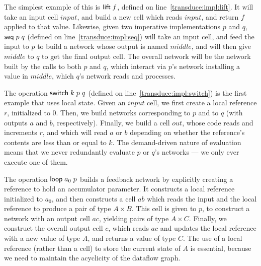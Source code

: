 \documentclass[natbib]{sigplanconf}
\begin{document}
The simplest example of this is $\mbox{\textsf{{lift}}}\; f$, defined on
line~\ref{transduce:impl:lift}. It will take an input cell $input$,
and build a new cell which reads $input$, and return $f$ applied to
that value. Likewise, given two imperative implementations $p$ and $q$,
$\mbox{\textsf{{seq}}}\; p\;q$ (defined on line~\ref{transduce:impl:seq}) will take
an input cell, and feed the input to $p$ to build a network whose
output is named $middle$, and will then give $middle$ to $q$ to get
the final output cell. The overall network will be the network built
by the calls to both $p$ and $q$, which interact via $p$'s network
installing a value in $middle$, which $q$'s network reads and processes.


The operation $\mbox{\textsf{{switch}}}\; k\;p\;q$ (defined on
line~\ref{transduce:impl:switch}) is the first example that uses local
state. Given an $input$ cell, we first create a local reference $r$,
initialized to $0$. Then, we build networks corresponding to $p$ and
to $q$ (with outputs $a$ and $b$, respectively). Finally, we build a cell
$out$, whose code reads and increments $r$, and which will read $a$ or
$b$ depending on whether the reference's contents are less than or
equal to $k$. The demand-driven nature of evaluation means
that we never redundantly evaluate $p$ or $q$'s networks --- we only
ever execute one of them.

The operation $\mbox{\textsf{{loop}}}\; a_0\;p$ builds a feedback network by
explicitly creating a reference to hold an accumulator parameter. It
constructs a local reference initialized to $a_0$, and then constructs
a cell $ab$ which reads the input and the local reference to produce a
pair of type $A \times B$. This cell is given to $p$, to construct a
network with an output cell $ac$, yielding pairs of type $A \times
C$. Finally, we construct the overall output cell $c$, which reads
$ac$ and updates the local reference with a new value of type $A$, and
returns a value of type $C$. The use of a local reference (rather than
a cell) to store the current state of $A$ is essential, because we need
to maintain the acyclicity of the dataflow graph. 
\end{document}
